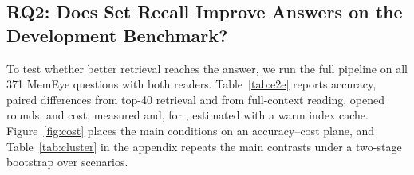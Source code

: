 \subsection{RQ2: Does Set Recall Improve Answers on the Development Benchmark?}
\label{sec:rq2}

To test whether better retrieval reaches the answer, we run the full pipeline on all 371 MemEye questions with both readers. Table~\ref{tab:e2e} reports accuracy, paired differences from top-40 retrieval and from full-context reading, opened rounds, and cost, measured and, for \qss{}, estimated with a warm index cache. Figure~\ref{fig:cost} places the main conditions on an accuracy--cost plane, and Table~\ref{tab:cluster} in the appendix repeats the main contrasts under a two-stage bootstrap over scenarios.

\begin{table}[t]
\centering
\caption{End-to-end accuracy on MemEye (371 questions; development benchmark). $\Delta$ columns give paired differences with 95\% question-level bootstrap intervals. Cost is the spend per 1k questions over all calls except the judge: measured, and after the slash estimated with the static index served from the prefix cache (Appendix~\ref{app:cost}).}
\label{tab:e2e}
\small
{}
\end{table}
